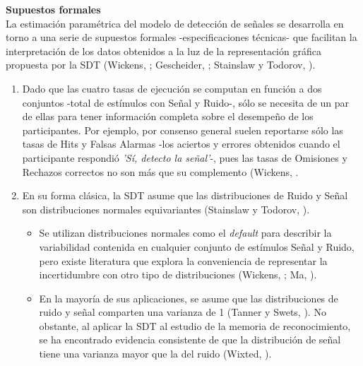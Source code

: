   \textbf{Supuestos formales}\\

La estimación paramétrica del modelo de detección de señales se desarrolla en torno a una serie de supuestos formales -especificaciones técnicas- que facilitan la interpretación de los datos obtenidos a la luz de la representación gráfica propuesta por la SDT (Wickens, \citeyear{Wickens1}; Gescheider, \citeyear{Gescheider}; Stainslaw y Todorov, \citeyear{Stainslaw1999}).\\ 

\begin{enumerate}

\item  Dado que las cuatro tasas de ejecución se computan en función a dos conjuntos -total de estímulos con Señal y Ruido-, sólo se necesita de un par de ellas para tener información completa sobre el desempeño de los participantes. Por ejemplo, por consenso general suelen reportarse sólo las tasas de Hits y Falsas Alarmas -los aciertos y errores obtenidos cuando el participante respondió \textit{'Sí, detecto la señal'}-, pues las tasas de Omisiones y Rechazos correctos no son más que su complemento (Wickens, \citeyear{Wickens1}.\\

\item En su forma clásica, la SDT asume que las distribuciones de Ruido y Señal son distribuciones normales equivariantes (Stainslaw y Todorov, \citeyear{Stainslaw1999}).\\
  \begin{itemize}
  \item Se utilizan distribuciones normales como el \textit{default} para describir la variabilidad contenida en cualquier conjunto de estímulos Señal y Ruido, pero existe literatura que explora la conveniencia de representar la incertidumbre con otro tipo de distribuciones (Wickens, \citeyear{Wickens1}; Ma, \citeyear{WeijiMa2009}).\\
  \item En la mayoría de sus aplicaciones, se asume que las distribuciones de ruido y señal comparten una varianza de 1 (Tanner y Swets, \citeyear{Tanner1954}). No obstante, al aplicar la SDT al estudio de la memoria de reconocimiento, se ha encontrado evidencia consistente de que la distribución de señal tiene una varianza mayor que la del ruido (Wixted, \citeyear{Wixted2007}).\\
  \end{itemize}


\end{enumerate}
